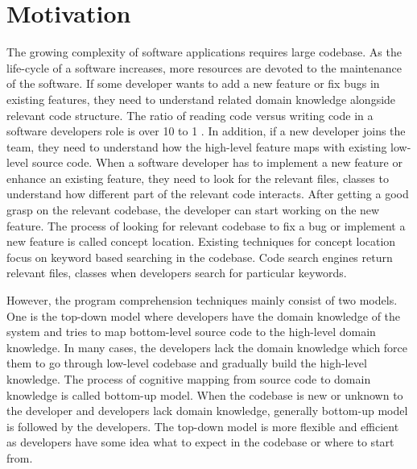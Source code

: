 \section{Motivation}
 The growing complexity of software applications requires large codebase. As the life-cycle of a software increases, more resources are devoted to the maintenance of the software. If some developer wants to add a new feature or fix bugs in existing features, they need to understand related domain knowledge alongside relevant code structure. The ratio of reading code versus writing code in a software developers role is over 10 to 1 \cite{martin2008clean}. In addition, if a new developer joins the team, they need to understand how the high-level feature maps with existing low-level source code. When a software developer has to implement a new feature or enhance an existing feature, they need to look for the relevant files, classes to understand how different part of the relevant code interacts. After getting a good grasp on the relevant codebase, the developer can start working on the new feature. The process of looking for relevant codebase to fix a bug or implement a new feature is called concept location. Existing techniques for concept location focus on keyword based searching in the codebase. Code search engines return relevant files, classes when developers search for particular keywords. 
 
 However, the program comprehension techniques mainly consist of two models. One is the top-down model where developers have the domain knowledge of the system and tries to map bottom-level source code to the high-level domain knowledge. In many cases, the developers lack the domain knowledge which force them to go through low-level codebase and gradually build the high-level knowledge. The process of cognitive mapping from source code to domain knowledge is called bottom-up model. When the codebase is new or unknown to the developer and developers lack domain knowledge, generally bottom-up model is followed by the developers. The top-down model is more flexible and efficient as developers have some idea what to expect in the codebase or where to start from. 
 
